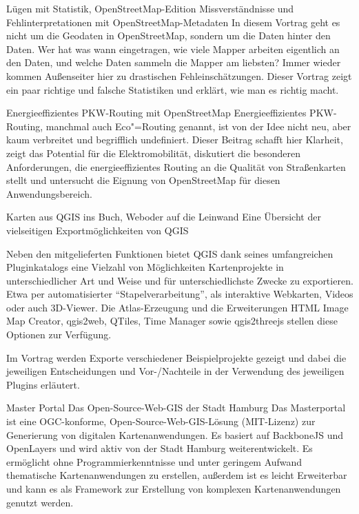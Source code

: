 %
{Lügen mit Statistik, OpenStreetMap-Edition\vspace{0.2em}}%
{Missverständnisse und Fehlinterpretationen mit OpenStreetMap-Metadaten}%
{%
In diesem Vortrag geht es nicht um die Geodaten in OpenStreetMap, sondern um die Daten hinter den
Daten. Wer hat was wann eingetragen, wie viele Mapper arbeiten eigentlich an den Daten, und welche
Daten sammeln die Mapper am liebsten? Immer wieder kommen Außenseiter hier zu drastischen
Fehleinschätzungen. Dieser Vortrag zeigt ein paar richtige und falsche Statistiken und erklärt, wie
man es richtig macht.%
}

%
{Energieeffizientes PKW-Routing mit OpenStreetMap}%
{}%
{%
Energieeffizientes PKW-Routing, manchmal auch Eco"=Routing genannt, ist von der Idee nicht neu, aber
kaum verbreitet und begrifflich undefiniert. Dieser Beitrag schafft hier Klarheit, zeigt das
Potential für die Elektromobilität, diskutiert die besonderen Anforderungen, die energieeffizientes
Routing an die Qualität von Straßenkarten stellt und untersucht die Eignung von OpenStreetMap für
diesen Anwendungsbereich.%
}



%
{Karten aus QGIS ins Buch, Web\linebreak oder auf die Leinwand\vspace{0.2em}}%
{Eine Übersicht der vielseitigen \mbox{Exportmöglichkeiten} von QGIS}%
{%
Neben den mitgelieferten Funktionen bietet QGIS dank seines umfangreichen Pluginkatalogs eine
Vielzahl von Möglichkeiten Kartenprojekte in unterschiedlicher Art und Weise und für
unterschiedlichste Zwecke zu exportieren. Etwa per automatisierter "`Stapelverarbeitung"', als
interaktive Webkarten, Videos oder auch 3D-Viewer. Die Atlas-Erzeugung und die Erweiterungen HTML Image
Map Creator, qgis2web, QTiles, Time Manager sowie qgis2threejs stellen diese Optionen zur Verfügung.

Im Vortrag werden Exporte verschiedener Beispielprojekte gezeigt und dabei die jeweiligen
Entscheidungen und Vor-/Nachteile in der Verwendung des jeweiligen Plugins erläutert.%
}

%
{Master Portal}%
{Das Open-Source-Web-GIS der Stadt Hamburg}%
{%
  Das Masterportal ist eine OGC-konforme, Open-Source-Web-GIS-Lösung (MIT-Lizenz) zur Generierung von digitalen
Kartenanwendungen. Es basiert auf BackboneJS und OpenLayers und wird aktiv von der Stadt Hamburg
weiterentwickelt. Es ermöglicht ohne Programmierkenntnisse und unter geringem Aufwand thematische
Kartenanwendungen zu erstellen, außerdem ist es leicht Erweiterbar und kann es als Framework zur
Erstellung von komplexen Kartenanwendungen genutzt werden.%
}

